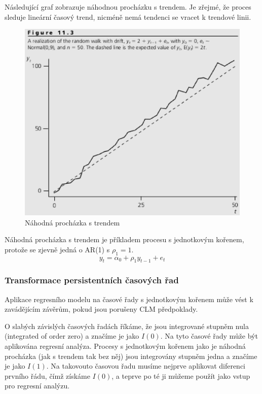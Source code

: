 Následující graf zobrazuje náhodnou procházku s trendem. Je zřejmé, že proces sleduje lineární časový trend, nicméně nemá tendenci se vracet k trendové linii.
\begin{figure}[htp]
\centering
\includegraphics[scale = 0.5]{pictures/figure_11_2.eps}
\caption{Náhodná procházka s trendem}
\label{figure_11_2}
\end{figure}

Náhodná procházka s trendem je příkladem procesu s jednotkovým kořenem, protože se zjevně jedná o AR(1) s  $\rho_1 = 1$.
\begin{equation}
y_t = \alpha_0 + \rho_1 y_{t - 1} + e_t
\end{equation}

\subsubsection{Transformace persistentních časových řad}

Aplikace regresního modelu na časové řady s jednotkovým kořenem může vést k zavádějícím závěrům, pokud jsou porušeny CLM předpoklady.

O slabých závislých časových řadách říkáme, že jsou integrované stupněm nula (integrated of order zero) a značíme je jako $I(0)$. Na tyto časové řady může být aplikována regresní analýza. Procesy s jednotkovým kořenem jako je náhodná procházka (jak s trendem tak bez něj) jsou integrovány stupněm jedna a značíme je jako $I(1)$. Na takovouto časovou řadu musíme nejprve aplikovat diferenci prvního řádu, čímž získáme $I(0)$, a teprve po té ji můžeme použít jako vstup pro regresní analýzu.

